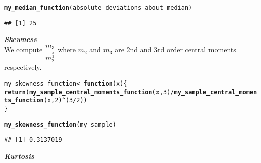 \documentclass[11pt, a4paper]{article}\usepackage[]{graphicx}\usepackage[]{xcolor}
\makeatletter
\newcommand{\hlnum}[1]{\textcolor[rgb]{0.686,0.059,0.569}{#1}}%
\newcommand{\hlopt}[1]{\textcolor[rgb]{0,0,0}{#1}}%
\newcommand{\hldef}[1]{\textcolor[rgb]{0.345,0.345,0.345}{#1}}%
\newcommand{\hlkwa}[1]{\textcolor[rgb]{0.161,0.373,0.58}{\textbf{#1}}}%
\newcommand{\hlkwb}[1]{\textcolor[rgb]{0.69,0.353,0.396}{#1}}%
\newcommand{\hlkwc}[1]{\textcolor[rgb]{0.333,0.667,0.333}{#1}}%
\newcommand{\hlkwd}[1]{\textcolor[rgb]{0.737,0.353,0.396}{\textbf{#1}}}%
\newenvironment{kframe}{%
 \def\at@end@of@kframe{}%
 \ifinner\ifhmode%
  \def\at@end@of@kframe{\end{minipage}}%
  \begin{minipage}{\columnwidth}%
 \fi\fi%
 \def\FrameCommand##1{\hskip\@totalleftmargin \hskip-\fboxsep
 \colorbox{shadecolor}{##1}\hskip-\fboxsep
     \hskip-\linewidth \hskip-\@totalleftmargin \hskip\columnwidth}%
 \MakeFramed {\advance\hsize-\width
   \@totalleftmargin\z@ \linewidth\hsize
   \@setminipage}}%
 {\par\unskip\endMakeFramed%
 \at@end@of@kframe}
\newenvironment{knitrout}{}{} %
\makeatother
\begin{document}
\begin{knitrout}\footnotesize
{}\color{fgcolor}\begin{kframe}
\begin{alltt}
\hlkwd{my_median_function}\hldef{(absolute_deviations_about_median)}
\end{alltt}
\begin{verbatim}
## [1] 25
\end{verbatim}
\end{kframe}
\end{knitrout}

\newpage

\faArrowAltCircleRight[regular] \textit{\textbf{Skewness}} \\

We compute $\dfrac{m_3}{m_2^\frac{3}{2}}$ where $m_2$ and $m_3$ are 2nd and 3rd order central moments respectively.
\begin{knitrout}\footnotesize
{}\color{fgcolor}\begin{kframe}
\begin{alltt}
\hldef{my_skewness_function} \hlkwb{<-} \hlkwa{function}\hldef{(}\hlkwc{x}\hldef{)\{}
  \hlkwd{return}\hldef{(}\hlkwd{my_sample_central_moments_function}\hldef{(x,} \hlnum{3}\hldef{)} \hlopt{/} \hlkwd{my_sample_central_moments_function}\hldef{(x,} \hlnum{2}\hldef{)}\hlopt{^}\hldef{(}\hlnum{3}\hlopt{/}\hlnum{2}\hldef{))}
\hldef{\}}
\end{alltt}
\end{kframe}
\end{knitrout}

\begin{knitrout}\footnotesize
{}\color{fgcolor}\begin{kframe}
\begin{alltt}
\hlkwd{my_skewness_function}\hldef{(my_sample)}
\end{alltt}
\begin{verbatim}
## [1] 0.3137019
\end{verbatim}
\end{kframe}
\end{knitrout}


\vspace{2cm}

\faArrowAltCircleRight[regular] \textit{\textbf{Kurtosis}} \\
\end{document}
